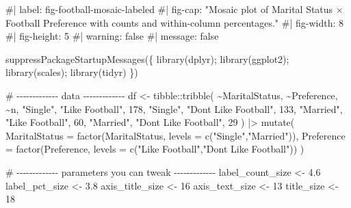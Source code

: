 \documentclass[
  letterpaper,
  DIV=11,
  numbers=noendperiod]{scrreprt}
\newenvironment{Shaded}{\begin{snugshade}}{\end{snugshade}}
\newcommand{\AttributeTok}[1]{\textcolor[rgb]{0.40,0.45,0.13}{#1}}
\newcommand{\CommentTok}[1]{\textcolor[rgb]{0.37,0.37,0.37}{#1}}
\newcommand{\DecValTok}[1]{\textcolor[rgb]{0.68,0.00,0.00}{#1}}
\newcommand{\FloatTok}[1]{\textcolor[rgb]{0.68,0.00,0.00}{#1}}
\newcommand{\FunctionTok}[1]{\textcolor[rgb]{0.28,0.35,0.67}{#1}}
\newcommand{\NormalTok}[1]{\textcolor[rgb]{0.00,0.23,0.31}{#1}}
\newcommand{\OtherTok}[1]{\textcolor[rgb]{0.00,0.23,0.31}{#1}}
\newcommand{\SpecialCharTok}[1]{\textcolor[rgb]{0.37,0.37,0.37}{#1}}
\newcommand{\StringTok}[1]{\textcolor[rgb]{0.13,0.47,0.30}{#1}}
\begin{document}
\begin{Shaded}
\begin{Highlighting}[]
\CommentTok{\#| label: fig{-}football{-}mosaic{-}labeled}
\CommentTok{\#| fig{-}cap: "Mosaic plot of Marital Status × Football Preference with counts and within{-}column percentages."}
\CommentTok{\#| fig{-}width: 8}
\CommentTok{\#| fig{-}height: 5}
\CommentTok{\#| warning: false}
\CommentTok{\#| message: false}

\FunctionTok{suppressPackageStartupMessages}\NormalTok{(\{}
  \FunctionTok{library}\NormalTok{(dplyr); }\FunctionTok{library}\NormalTok{(ggplot2); }\FunctionTok{library}\NormalTok{(scales); }\FunctionTok{library}\NormalTok{(tidyr)}
\NormalTok{\})}

\CommentTok{\# {-}{-}{-}{-}{-}{-}{-}{-}{-}{-}{-}{-}{-} data {-}{-}{-}{-}{-}{-}{-}{-}{-}{-}{-}{-}{-}}
\NormalTok{df }\OtherTok{\textless{}{-}}\NormalTok{ tibble}\SpecialCharTok{::}\FunctionTok{tribble}\NormalTok{(}
  \SpecialCharTok{\textasciitilde{}}\NormalTok{MaritalStatus, }\SpecialCharTok{\textasciitilde{}}\NormalTok{Preference,            }\SpecialCharTok{\textasciitilde{}}\NormalTok{n,}
  \StringTok{"Single"}\NormalTok{,       }\StringTok{"Like Football"}\NormalTok{,        }\DecValTok{178}\NormalTok{,}
  \StringTok{"Single"}\NormalTok{,       }\StringTok{"Don\textquotesingle{}t Like Football"}\NormalTok{,  }\DecValTok{133}\NormalTok{,}
  \StringTok{"Married"}\NormalTok{,      }\StringTok{"Like Football"}\NormalTok{,         }\DecValTok{60}\NormalTok{,}
  \StringTok{"Married"}\NormalTok{,      }\StringTok{"Don\textquotesingle{}t Like Football"}\NormalTok{,   }\DecValTok{29}
\NormalTok{) }\SpecialCharTok{|\textgreater{}}
  \FunctionTok{mutate}\NormalTok{(}
    \AttributeTok{MaritalStatus =} \FunctionTok{factor}\NormalTok{(MaritalStatus, }\AttributeTok{levels =} \FunctionTok{c}\NormalTok{(}\StringTok{"Single"}\NormalTok{,}\StringTok{"Married"}\NormalTok{)),}
    \AttributeTok{Preference    =} \FunctionTok{factor}\NormalTok{(Preference,    }\AttributeTok{levels =} \FunctionTok{c}\NormalTok{(}\StringTok{"Like Football"}\NormalTok{,}\StringTok{"Don\textquotesingle{}t Like Football"}\NormalTok{))}
\NormalTok{  )}

\CommentTok{\# {-}{-}{-}{-}{-}{-}{-}{-}{-}{-}{-}{-}{-} parameters you can tweak {-}{-}{-}{-}{-}{-}{-}{-}{-}{-}{-}{-}{-}}
\NormalTok{label\_count\_size }\OtherTok{\textless{}{-}} \FloatTok{4.6}
\NormalTok{label\_pct\_size   }\OtherTok{\textless{}{-}} \FloatTok{3.8}
\NormalTok{axis\_title\_size  }\OtherTok{\textless{}{-}} \DecValTok{16}
\NormalTok{axis\_text\_size   }\OtherTok{\textless{}{-}} \DecValTok{13}
\NormalTok{title\_size       }\OtherTok{\textless{}{-}} \DecValTok{18}


\end{Highlighting}
\end{Shaded}
\end{document}
